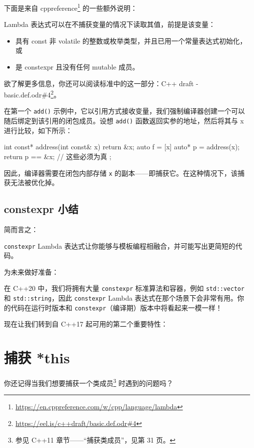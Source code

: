 下面是来自 cppreference\footnote{\url{https://en.cppreference.com/w/cpp/language/lambda}} 的一些额外说明：

Lambda 表达式可以在不捕获变量的情况下读取其值，前提是该变量：

\begin{itemize}
\item 具有 const 非 volatile 的整数或枚举类型，并且已用一个常量表达式初始化，或
\item 是 constexpr 且没有任何 mutable 成员。
\end{itemize}

欲了解更多信息，你还可以阅读标准中的这一部分：C++ draft - basic.def.odr\#4\footnote{\url{https://eel.is/c++draft/basic.def.odr\#4}}。

在第一个 \texttt{add()} 示例中，它以引用方式接收变量，我们强制编译器创建一个可以随后绑定到该引用的闭包成员。设想 \texttt{add()} 函数返回实参的地址，然后将其与 x 进行比较，如下所示：

\begin{codebox}
int const* address(int const& x) {
return &x;
}
auto f = [x] {
auto* p = address(x);
return p == &x; // 这些必须为真
};
\end{codebox}

因此，编译器需要在闭包内部存储 \texttt{x} 的副本——即捕获它。在这种情况下，该捕获无法被优化掉。

\subsection{constexpr 小结}

简而言之：

\texttt{constexpr} Lambda 表达式让你能够与模板编程相融合，并可能写出更简短的代码。


为未来做好准备：

在 C++20 中，我们将拥有大量 \texttt{constexpr} 标准算法和容器，例如 \texttt{std::vector} 和 \texttt{std::string}，因此 \texttt{constexpr} Lambda 表达式在那个场景下会非常有用。你的代码在运行时版本和 \texttt{constexpr}（编译期）版本中将看起来一模一样！

现在让我们转到自 C++17 起可用的第二个重要特性：

\section{捕获 *this}

你还记得当我们想要捕获一个类成员\footnote{参见 C++11 章节——“捕获类成员”，见第 31 页。} 时遇到的问题吗？

